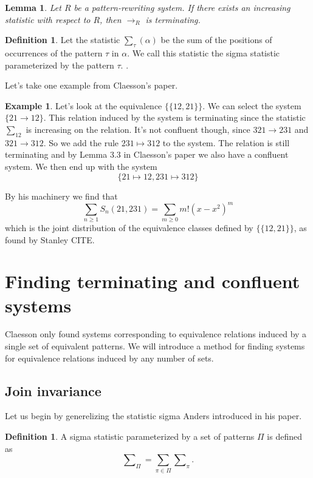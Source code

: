 \documentclass[openany, a4paper, 11pt, english]{article}
\newcommand{\breath}{\vspace{6pt plus 2pt minus 1pt}\noindent}
\newcommand{\patternrule}{ \mapsto \!}
\newtheorem{lemma}[theorem]{Lemma}
\theoremstyle{definition}
\newtheorem{definition}[theorem]{Definition}
\newtheorem{example}[theorem]{Example}
\newcommand{\Sym}{S}
\begin{document}
\begin{lemma}
    Let $R$ be a pattern-rewriting system. If there exists an increasing
    statistic with respect to $R$, then $\to_R$ is terminating.    
\end{lemma}

\begin{definition}
    Let the statistic $\sum_\tau(\alpha)$ be the sum of the positions of occurrences of
    the pattern $\tau$ in $\alpha$. We call this statistic the sigma statistic
    parameterized by the pattern $\tau$.
    \cite{claesson:2021}.
\end{definition}

Let's take one example from Claesson's paper.
\begin{example}
    Let's look at the equivalence $\{ \{ 12, 21 \} \}$. We can select the system $\{
        21 \to 12 \}$. This relation induced by the system is terminating since the statistic
    $\sum_{12}$ is increasing on the relation. It's not
    confluent though, since $321 \to 231$ and $321 \to 312$. So we add the rule
    $231 \patternrule 312$ to the system. The relation is still terminating and by Lemma
    3.3 in Claesson's paper we also have a confluent system. We then end up with
    the system 
    \[
        \{ 21 \patternrule 12, 231 \patternrule 312 \}
    \]

    \breath

    By his machinery we find that 
    \[
        \sum_{n \geq 1} \Sym_n(21, 231) = \sum_{m \geq 0} m!(x-x^2)^m
    \]
    which is the joint distribution of the equivalence classes defined by 
    $\{ \{ 12, 21 \} \}$, as found by Stanley CITE.
\end{example}

\section{Finding terminating and confluent systems}
Claesson only found systems corresponding to equivalence relations induced by a
single set of equivalent patterns. We will introduce a method for finding
systems for equivalence relations induced by any number of sets.

\subsection{Join invariance}
Let us begin by generelizing the statistic sigma Anders introduced in his paper.

\begin{definition}
    A sigma statistic parameterized by a set of patterns $\Pi$ is defined as
    $$
        \sum\nolimits_\Pi = \sum_{\pi \in \Pi} \sum\nolimits_{\pi}.
    $$
\end{definition}
\end{document}
